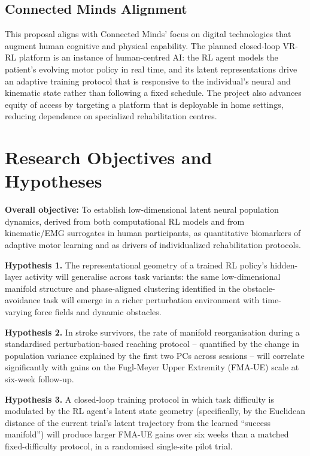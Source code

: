 \documentclass[12pt]{article}
\begin{document}
\subsection{Connected Minds Alignment}

This proposal aligns with Connected Minds' focus on digital technologies
that augment human cognitive and physical capability.
The planned closed-loop VR-RL platform is an instance of human-centred AI:
the RL agent models the patient's evolving motor policy in real time, and
its latent representations drive an adaptive training protocol that is
responsive to the individual's neural and kinematic state rather than
following a fixed schedule.
The project also advances equity of access by targeting a platform that
is deployable in home settings, reducing dependence on specialized
rehabilitation centres.

\section{Research Objectives and Hypotheses}

\textbf{Overall objective:}
To establish low-dimensional latent neural population dynamics, derived
from both computational RL models and from kinematic/EMG surrogates in
human participants, as quantitative biomarkers of adaptive motor learning
and as drivers of individualized rehabilitation protocols.

\textbf{Hypothesis 1.}
The representational geometry of a trained RL policy's hidden-layer activity
will generalise across task variants: the same low-dimensional manifold
structure and phase-aligned clustering identified in the obstacle-avoidance
task will emerge in a richer perturbation environment with time-varying
force fields and dynamic obstacles.

\textbf{Hypothesis 2.}
In stroke survivors, the rate of manifold reorganisation during a
standardised perturbation-based reaching protocol -- quantified by the
change in population variance explained by the first two PCs across
sessions -- will correlate significantly with gains on the Fugl-Meyer
Upper Extremity (FMA-UE) scale at six-week follow-up.

\textbf{Hypothesis 3.}
A closed-loop training protocol in which task difficulty is modulated by
the RL agent's latent state geometry (specifically, by the Euclidean
distance of the current trial's latent trajectory from the learned
``success manifold'') will produce larger FMA-UE gains over six weeks than
a matched fixed-difficulty protocol, in a randomised single-site pilot trial.
\end{document}
